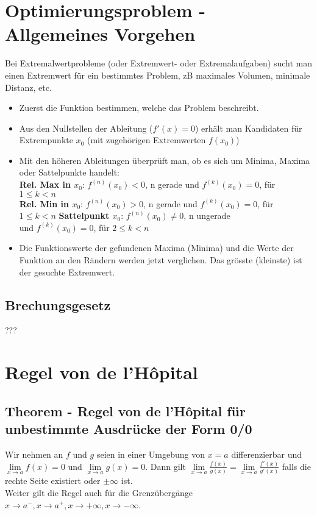 \documentclass[../main.tex]{subfiles}
\begin{document}
\section{Optimierungsproblem - Allgemeines Vorgehen}
Bei Extremalwertprobleme (oder Extremwert- oder Extremalaufgaben) sucht man einen 
Extremwert für ein bestimmtes Problem, zB maximales Volumen, minimale Distanz, etc.

\begin{itemize}
    \item Zuerst die Funktion bestimmen, welche das Problem beschreibt.
    \item Aus den Nullstellen der Ableitung ($f'(x)=0$) erhält man Kandidaten für Extrempunkte $x_0$
    (mit zugehörigen Extremwerten $f(x_0)$)
    \item Mit den höheren Ableitungen überprüft man, ob es sich um Minima, Maxima oder Sattelpunkte handelt: \\
    \textbf{Rel. Max in $x_0$}: $f^{(n)}(x_0)<0$, n gerade und $f^{(k)}(x_0)=0$, für $1 \leq k < n$ \\
    \textbf{Rel. Min in $x_0$}: $f^{(n)}(x_0)>0$, n gerade und $f^{(k)}(x_0)=0$, für $1 \leq k < n$
    \textbf{Sattelpunkt $x_0$}: $f^{(n)}(x_0) \neq 0$, n ungerade \\
    und $f^{(k)}(x_0)=0$, für $2 \leq k < n$ 
    \item Die Funktionswerte der gefundenen Maxima (Minima) und die Werte der Funktion an den Rändern werden 
    jetzt verglichen. Das grösste (kleinste) ist der gesuchte Extremwert.
\end{itemize}

\subsection{Brechungsgesetz}
???


\section{Regel von de l'Hôpital}
\subsection{Theorem - Regel von de l'Hôpital für unbestimmte Ausdrücke der Form 0/0}
Wir nehmen an $f$ und $g$ seien in einer Umgebung von $x=a$ differenzierbar und $\lim\limits_{x \to a}f(x)=0$
und $\lim\limits_{x \to a}g(x)=0$. Dann gilt $\lim\limits_{x \to a}\frac{f(x)}{g(x)} = \lim\limits_{x \to a}\frac{f'(x)}{g'(x)}$
falls die rechte Seite existiert oder $\pm \infty$ ist. \\
Weiter gilt die Regel auch für die Grenzübergänge $x \to a^-,x \to a^+, x \to +\infty,x \to -\infty$.
\end{document}
